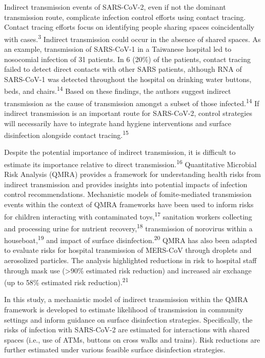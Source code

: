 \documentclass[journal=jacsat,manuscript=article]{achemso}
\begin{document}
Indirect transmission events of SARS-CoV-2, even if not the dominant
transmission route, complicate infection control efforts using contact
tracing. Contact tracing efforts focus on identifying people sharing
spaces coincidentally with cases.\textsuperscript{3} Indirect
transmission could occur in the absence of shared spaces. As an example,
transmission of SARS-CoV-1 in a Taiwanese hospital led to nosocomial
infection of 31 patients. In 6 (20\%) of the patients, contact tracing
failed to detect direct contacts with other SARS patients, although RNA
of SARS-CoV-1 was detected throughout the hospital on drinking water
buttons, beds, and chairs.\textsuperscript{14} Based on these findings,
the authors suggest indirect transmission as the cause of transmission
amongst a subset of those infected.\textsuperscript{14} If indirect
transmission is an important route for SARS-CoV-2, control strategies
will necessarily have to integrate hand hygiene interventions and
surface disinfection alongside contact tracing.\textsuperscript{15}

Despite the potential importance of indirect transmission, it is
difficult to estimate its importance relative to direct
transmission.\textsuperscript{16} Quantitative Microbial Risk Analysis
(QMRA) provides a framework for understanding health risks from indirect
transmission and provides insights into potential impacts of infection
control recommendations. Mechanistic models of fomite-mediated
transmission events within the context of QMRA frameworks have been used
to inform risks for children interacting with contaminated
toys,\textsuperscript{17} sanitation workers collecting and processing
urine for nutrient recovery,\textsuperscript{18} transmission of
norovirus within a houseboat,\textsuperscript{19} and impact of surface
disinfection.\textsuperscript{20} QMRA has also been adapted to evaluate
risks for hospital transmission of MERS-CoV through droplets and
aerosolized particles. The analysis highlighted reductions in risk to
hospital staff through mask use (\textgreater90\% estimated risk
reduction) and increased air exchange (up to 58\% estimated risk
reduction).\textsuperscript{21}

In this study, a mechanistic model of indirect transmission within the
QMRA framework is developed to estimate likelihood of transmission in
community settings and inform guidance on surface disinfection
strategies. Specifically, the risks of infection with SARS-CoV-2 are
estimated for interactions with shared spaces (i.e., use of ATMs,
buttons on cross walks and trains). Risk reductions are further
estimated under various feasible surface disinfection strategies.
\end{document}

